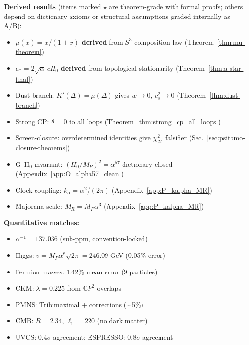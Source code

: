 \begin{tcolorbox}[colback=blue!5!white, colframe=blue!50!black, title=DFD: Unified Framework + Falsifiable Predictions, boxsep=3pt, left=3pt, right=3pt]
\small
\textbf{Derived results} (items marked $\star$ are theorem-grade with formal proofs; others depend on dictionary axioms or structural assumptions graded internally as A/B):
\begin{itemize}[itemsep=1pt, leftmargin=*, labelsep=4pt]
\item[$\star$] $\mu(x) = x/(1+x)$ \textbf{derived} from $S^3$ composition law (Theorem~\ref{thm:mu-theorem})
\item[$\star$] $a_* = 2\sqrt{\alpha}\,cH_0$ \textbf{derived} from topological stationarity (Theorem~\ref{thm:a-star-final})
\item[$\star$] Dust branch: $K'(\Delta)=\mu(\Delta)$ gives $w \to 0$, $c_s^2 \to 0$ (Theorem~\ref{thm:dust-branch})
\item[$\star$] Strong CP: $\bar{\theta} = 0$ to all loops (Theorem~\ref{thm:strong_cp_all_loops})
\item Screen-closure: overdetermined identities give $\chi^2_{\mathcal{M}}$ falsifier (Sec.~\ref{sec:psitomo-closure-theorems})
\item G--H$_0$ invariant: $(H_0/M_P)^2 = \alpha^{57}$ dictionary-closed (Appendix~\ref{app:O_alpha57_clean})
\item Clock coupling: $k_\alpha = \alpha^2/(2\pi)$ (Appendix~\ref{app:P_kalpha_MR})
\item Majorana scale: $M_R = M_P\alpha^3$ (Appendix~\ref{app:P_kalpha_MR})
\end{itemize}

\smallskip
\textbf{Quantitative matches:}
\begin{itemize}[itemsep=1pt, leftmargin=*, labelsep=4pt]
\item $\alpha^{-1} = 137.036$ (sub-ppm, convention-locked)
\item Higgs: $v = M_P\alpha^8\sqrt{2\pi} = 246.09$ GeV (0.05\% error)
\item Fermion masses: 1.42\% mean error (9 particles)
\item CKM: $\lambda = 0.225$ from $\mathbb{C}P^2$ overlaps
\item PMNS: Tribimaximal + corrections ($\sim$5\%)
\item CMB: $R = 2.34$, $\ell_1 = 220$ (no dark matter)
\item UVCS: $0.4\sigma$ agreement; ESPRESSO: $0.8\sigma$ agreement
\end{itemize}


\end{tcolorbox}
